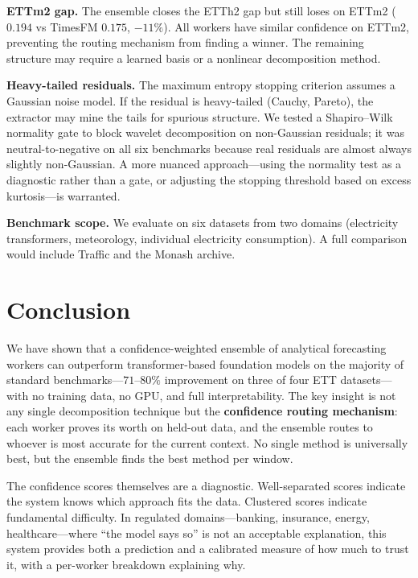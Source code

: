 \documentclass[sigconf,nonacm]{acmart}
\begin{document}
\textbf{ETTm2 gap.} The ensemble closes the ETTh2 gap but still loses on ETTm2 ($0.194$ vs TimesFM $0.175$, $-11\%$). All workers have similar confidence on ETTm2, preventing the routing mechanism from finding a winner. The remaining structure may require a learned basis or a nonlinear decomposition method.

\textbf{Heavy-tailed residuals.} The maximum entropy stopping criterion assumes a Gaussian noise model. If the residual is heavy-tailed (Cauchy, Pareto), the extractor may mine the tails for spurious structure. We tested a Shapiro--Wilk normality gate to block wavelet decomposition on non-Gaussian residuals; it was neutral-to-negative on all six benchmarks because real residuals are almost always slightly non-Gaussian. A more nuanced approach---using the normality test as a diagnostic rather than a gate, or adjusting the stopping threshold based on excess kurtosis---is warranted.

\textbf{Benchmark scope.} We evaluate on six datasets from two domains (electricity transformers, meteorology, individual electricity consumption). A full comparison would include Traffic and the Monash archive.

\section{Conclusion}

We have shown that a confidence-weighted ensemble of analytical forecasting workers can outperform transformer-based foundation models on the majority of standard benchmarks---$71$--$80\%$ improvement on three of four ETT datasets---with no training data, no GPU, and full interpretability. The key insight is not any single decomposition technique but the \textbf{confidence routing mechanism}: each worker proves its worth on held-out data, and the ensemble routes to whoever is most accurate for the current context. No single method is universally best, but the ensemble finds the best method per window.

The confidence scores themselves are a diagnostic. Well-separated scores indicate the system knows which approach fits the data. Clustered scores indicate fundamental difficulty. In regulated domains---banking, insurance, energy, healthcare---where ``the model says so'' is not an acceptable explanation, this system provides both a prediction and a calibrated measure of how much to trust it, with a per-worker breakdown explaining why.
\end{document}
